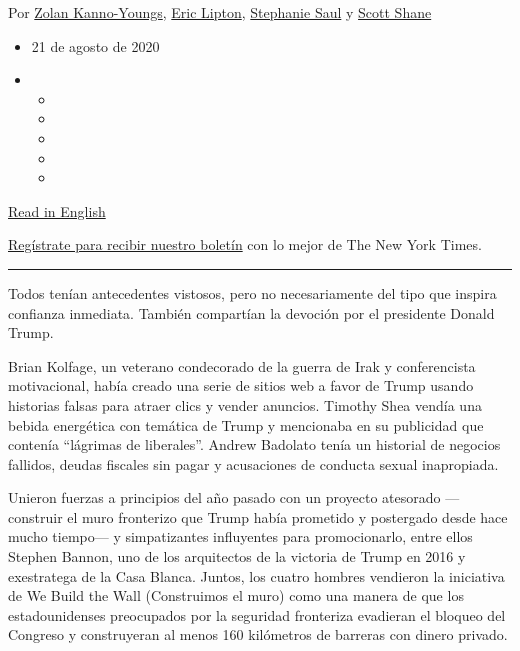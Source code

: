 Por
\href{https://www.nytimes3xbfgragh.onion/by/zolan-kanno-youngs}{Zolan
Kanno-Youngs},
\href{https://www.nytimes3xbfgragh.onion/by/eric-lipton}{Eric Lipton},
\href{https://www.nytimes3xbfgragh.onion/by/stephanie-saul}{Stephanie
Saul} y \href{https://www.nytimes3xbfgragh.onion/by/scott-shane}{Scott
Shane}

\begin{itemize}
\item
  21 de agosto de 2020
\item
  \begin{itemize}
  \item
  \item
  \item
  \item
  \item
  \end{itemize}
\end{itemize}

\href{https://www.nytimes3xbfgragh.onion/2020/08/20/us/politics/bannon-we-build-the-wall.html}{Read
in English}

\href{https://www.nytimes3xbfgragh.onion/newsletters/el-times}{Regístrate
para recibir nuestro boletín} con lo mejor de The New York Times.

\begin{center}\rule{0.5\linewidth}{\linethickness}\end{center}

Todos tenían antecedentes vistosos, pero no necesariamente del tipo que
inspira confianza inmediata. También compartían la devoción por el
presidente Donald Trump.

Brian Kolfage, un veterano condecorado de la guerra de Irak y
conferencista motivacional, había creado una serie de sitios web a favor
de Trump usando historias falsas para atraer clics y vender anuncios.
Timothy Shea vendía una bebida energética con temática de Trump y
mencionaba en su publicidad que contenía ``lágrimas de liberales''.
Andrew Badolato tenía un historial de negocios fallidos, deudas fiscales
sin pagar y acusaciones de conducta sexual inapropiada.

Unieron fuerzas a principios del año pasado con un proyecto atesorado
---construir el muro fronterizo que Trump había prometido y postergado
desde hace mucho tiempo--- y simpatizantes influyentes para
promocionarlo, entre ellos Stephen Bannon, uno de los arquitectos de la
victoria de Trump en 2016 y exestratega de la Casa Blanca. Juntos, los
cuatro hombres vendieron la iniciativa de We Build the Wall (Construimos
el muro) como una manera de que los estadounidenses preocupados por la
seguridad fronteriza evadieran el bloqueo del Congreso y construyeran al
menos 160 kilómetros de barreras con dinero privado.

